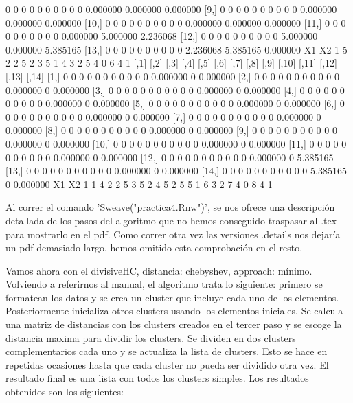 \documentclass[a4paper]{article}
\begin{document}
\begin{Schunk}
\begin{Soutput}
 [8,]    0    0    0    0    0    0    0    0    0     0 0.000000 0.000000 0.000000
 [9,]    0    0    0    0    0    0    0    0    0     0 0.000000 0.000000 0.000000
[10,]    0    0    0    0    0    0    0    0    0     0 0.000000 0.000000 0.000000
[11,]    0    0    0    0    0    0    0    0    0     0 0.000000 5.000000 2.236068
[12,]    0    0    0    0    0    0    0    0    0     0 5.000000 0.000000 5.385165
[13,]    0    0    0    0    0    0    0    0    0     0 2.236068 5.385165 0.000000
  X1 X2
1  5  2
2  5  2
3  5  1
4  3  2
5  4  0
6  4  1
      [,1] [,2] [,3] [,4] [,5] [,6] [,7] [,8] [,9] [,10] [,11]    [,12] [,13]    [,14]
 [1,]    0    0    0    0    0    0    0    0    0     0     0 0.000000     0 0.000000
 [2,]    0    0    0    0    0    0    0    0    0     0     0 0.000000     0 0.000000
 [3,]    0    0    0    0    0    0    0    0    0     0     0 0.000000     0 0.000000
 [4,]    0    0    0    0    0    0    0    0    0     0     0 0.000000     0 0.000000
 [5,]    0    0    0    0    0    0    0    0    0     0     0 0.000000     0 0.000000
 [6,]    0    0    0    0    0    0    0    0    0     0     0 0.000000     0 0.000000
 [7,]    0    0    0    0    0    0    0    0    0     0     0 0.000000     0 0.000000
 [8,]    0    0    0    0    0    0    0    0    0     0     0 0.000000     0 0.000000
 [9,]    0    0    0    0    0    0    0    0    0     0     0 0.000000     0 0.000000
[10,]    0    0    0    0    0    0    0    0    0     0     0 0.000000     0 0.000000
[11,]    0    0    0    0    0    0    0    0    0     0     0 0.000000     0 0.000000
[12,]    0    0    0    0    0    0    0    0    0     0     0 0.000000     0 5.385165
[13,]    0    0    0    0    0    0    0    0    0     0     0 0.000000     0 0.000000
[14,]    0    0    0    0    0    0    0    0    0     0     0 5.385165     0 0.000000
  X1 X2
1  1  4
2  2  5
3  5  2
4  5  2
5  5  1
6  3  2
7  4  0
8  4  1
\end{Soutput}
\end{Schunk}

Al correr el comando 'Sweave("practica4.Rnw")', se nos ofrece una descripción detallada de los pasos del algoritmo que no hemos conseguido traspasar al .tex para mostrarlo en el pdf.
Como correr otra vez las versiones .details nos dejaría un pdf demasiado largo, hemos omitido esta comprobación en el resto.

Vamos ahora con el divisiveHC, distancia: chebyshev, approach: mínimo.
Volviendo a referirnos al manual, el algoritmo trata lo siguiente: primero se formatean los datos y se crea un cluster que incluye cada uno de los elementos. Posteriormente inicializa otros clusters usando los elementos iniciales. Se calcula una matriz de distancias con los clusters creados en el tercer paso y se escoge la distancia maxima para dividir los clusters. Se dividen en dos clusters complementarios cada uno y se actualiza la lista de clusters. Esto se hace en repetidas ocasiones hasta que cada cluster no pueda ser dividido otra vez. El resultado final es una lista con todos los clusters simples. Los resultados obtenidos son los siguientes:
\end{document}
